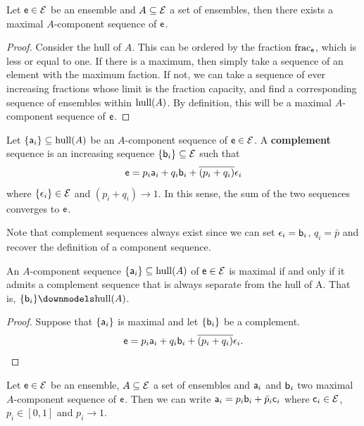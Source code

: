 \begin{prop}
	Let $\ens \in \Ens$ be an ensemble and $A \subseteq \Ens$ a set of ensembles, then there exists a maximal $A$-component sequence of $\ens$.
\end{prop}

\begin{proof}
	Consider the hull of $A$. This can be ordered by the fraction $\fraction_{\ens}$, which is less or equal to one. If there is a maximum, then simply take a sequence of an element with the maximum faction. If not, we can take a sequence of ever increasing fractions whose limit is the fraction capacity, and find a corresponding sequence of ensembles within $\hull(A)$. By definition, this will be a maximal $A$-component sequence of $\ens$.
\end{proof}

\begin{prop}
	Let $\{\ens[a]_i\} \subseteq \hull(A)$ be an $A$-component sequence of $\ens \in \Ens$. A \textbf{complement} sequence is an increasing sequence $\{\ens[b]_i\} \subseteq \Ens$ such that
	$$ \ens = p_i \ens[a]_i + q_i \ens[b]_i + \overline{(p_i + q_i)} \ens[\epsilon]_i $$
	where $\{\ens[\epsilon]_i\} \in \Ens$ and $(p_i + q_i) \to 1$. In this sense, the sum of the two sequences converges to $\ens$.
\end{prop}

\begin{remark}
	Note that complement sequences always exist since we can set $\ens[\epsilon]_i = \ens[b]_i$, $q_i = \bar{p}$ and recover the definition of a component sequence.
\end{remark}

\begin{prop}
	An $A$-component sequence $\{\ens[a]_i\} \subseteq \hull(A)$ of $\ens \in \Ens$ is maximal if and only if it admits a complement sequence that is always separate from the hull of A. That is, $\{\ens[b]_i\} \separate \hull(A)$.
\end{prop}

\begin{proof}
	Suppose that $\{\ens[a]_i\}$ is maximal and let $\{\ens[b]_i\}$ be a complement.
	$$ \ens = p_i \ens[a]_i + q_i \ens[b]_i + \overline{(p_i + q_i)} \ens[\epsilon]_i.$$
	
\end{proof}

\begin{prop}
	Let $\ens \in \Ens$ be an ensemble, $A \subseteq \Ens$ a set of ensembles and $\ens[a]_i$ and $\ens[b]_i$ two maximal $A$-component sequence of $\ens$. Then we can write $\ens[a]_i = p_i \ens[b]_i + \bar{p}_i \ens[c]_i$ where $\ens[c]_i \in \Ens$, $p_i \in [0,1]$ and $p_i \to 1$.
\end{prop}

